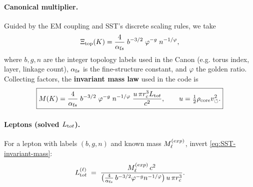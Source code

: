 \documentclass[11pt]{article}
\begin{document}
        \paragraph{Canonical multiplier.}
            Guided by the EM coupling and SST’s discrete scaling rules, we take
            \[
                \Xi_{\text{top}}(K)=\frac{4}{\alpha_{\textrm fs}}\;b^{-3/2}\;\varphi^{-g}\;n^{-1/\varphi},
            \]
            where $b,g,n$ are the integer topology labels used in the Canon (e.g. torus index, layer, linkage count), $\alpha_{\textrm fs}$ is the fine-structure constant, and $\varphi$ the golden ratio. Collecting factors, the \textbf{invariant mass law} used in the code is
            \begin{equation*}
                \boxed{M(K)=\frac{4}{\alpha_{\textrm fs}}\;b^{-3/2}\;\varphi^{-g}\;n^{-1/\varphi}\;
                \frac{u\,\pi r_c^3 L_{\textrm tot}}{c^2},
                    \qquad
                    u=\tfrac{1}{2}\rho_{\text{core}}v_{\circlearrowleft}^2.
                    }\label{eq:SST-invariant-mass}
            \end{equation*}

        \paragraph{Leptons (solved $L_{\textrm tot}$).}
            For a lepton with labels $(b,g,n)$ and known mass $M_\ell^{\textrm(exp)}$, invert \eqref{eq:SST-invariant-mass}:
            \[
                L_{\textrm tot}^{(\ell)} \;=\;
                \frac{M_\ell^{\textrm(exp)}\,c^2}{\big(\tfrac{4}{\alpha_{\textrm fs}}\,b^{-3/2}\varphi^{-g}n^{-1/\varphi}\big)\,u\,\pi r_c^3}.
            \]
\end{document}
